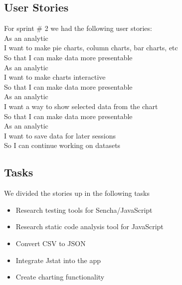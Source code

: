 \subsection{User Stories}
For sprint \# 2 we had the following user stories: \\
As an analytic \\
I want to make pie charts, column charts, bar charts, etc \\
So that I can make data more presentable \\

As an analytic \\
I want to make charts interactive  \\
So that I can make data more presentable \\

As an analytic \\
I want a way to show selected data from the chart \\
So that I can make data more presentable\\

As an analytic \\
I want to save data for later sessions \\
So I can continue working on datasets \\

\subsection{Tasks} %
\label{sub:Tasks}
We divided the stories up in the following tasks
\begin{itemize}
	\item Research testing tools for Sencha/JavaScript
	\item Research static code analysis tool for JavaScript
	\item Convert CSV to JSON
	\item Integrate Jstat into the app
	\item Create charting functionality
\end{itemize}










